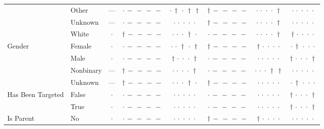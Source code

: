 {\begin{longtable}[t]{llcccccc}
 & Other & --- & ${\cdot}\,{-}\,{-}\,{-}\,{-}$ & ${\cdot}\,{\dagger}\,{\cdot}\,{\dagger}\,{\dagger}$ & ${\dagger}\,{-}\,{-}\,{-}\,{-}$ & ${\cdot}\,{\cdot}\,{\cdot}\,{\cdot}\,{\dagger}$ & ${\cdot}\,{\cdot}\,{\cdot}\,{\cdot}\,{\cdot}$ \\
 & Unknown & --- & ${\cdot}\,{-}\,{-}\,{-}\,{-}$ & ${\cdot}\,{\cdot}\,{\cdot}\,{\cdot}\,{\cdot}$ & ${\dagger}\,{-}\,{-}\,{-}\,{-}$ & ${\cdot}\,{\cdot}\,{\cdot}\,{\cdot}\,{\dagger}$ & ${\cdot}\,{\cdot}\,{\cdot}\,{\cdot}\,{\cdot}$ \\
 & White & $\cdot$ & ${\dagger}\,{-}\,{-}\,{-}\,{-}$ & ${\cdot}\,{\cdot}\,{\cdot}\,{\dagger}\,{\cdot}$ & ${\cdot}\,{-}\,{-}\,{-}\,{-}$ & ${\cdot}\,{\cdot}\,{\cdot}\,{\cdot}\,{\dagger}$ & ${\dagger}\,{\cdot}\,{\cdot}\,{\cdot}\,{\cdot}$ \\
\cline{1-8}
\multirow[t]{4}{*}{Gender} & Female & $\cdot$ & ${\cdot}\,{-}\,{-}\,{-}\,{-}$ & ${\cdot}\,{\cdot}\,{\dagger}\,{\cdot}\,{\dagger}$ & ${\dagger}\,{-}\,{-}\,{-}\,{-}$ & ${\dagger}\,{\cdot}\,{\cdot}\,{\cdot}\,{\cdot}$ & ${\cdot}\,{\dagger}\,{\cdot}\,{\cdot}\,{\cdot}$ \\
 & Male & $\cdot$ & ${\cdot}\,{-}\,{-}\,{-}\,{-}$ & ${\dagger}\,{\cdot}\,{\cdot}\,{\cdot}\,{\dagger}$ & ${\cdot}\,{-}\,{-}\,{-}\,{-}$ & ${\cdot}\,{\cdot}\,{\cdot}\,{\cdot}\,{\cdot}$ & ${\dagger}\,{\cdot}\,{\cdot}\,{\cdot}\,{\dagger}$ \\
 & Nonbinary & --- & ${\dagger}\,{-}\,{-}\,{-}\,{-}$ & ${\cdot}\,{\cdot}\,{\cdot}\,{\cdot}\,{\dagger}$ & ${\cdot}\,{-}\,{-}\,{-}\,{-}$ & ${\cdot}\,{\cdot}\,{\cdot}\,{\dagger}\,{\dagger}$ & ${\cdot}\,{\cdot}\,{\cdot}\,{\cdot}\,{\cdot}$ \\
 & Unknown & --- & ${\dagger}\,{-}\,{-}\,{-}\,{-}$ & ${\cdot}\,{\cdot}\,{\cdot}\,{\dagger}\,{\cdot}$ & ${\dagger}\,{-}\,{-}\,{-}\,{-}$ & ${\cdot}\,{\cdot}\,{\cdot}\,{\cdot}\,{\cdot}$ & ${\cdot}\,{\dagger}\,{\cdot}\,{\cdot}\,{\cdot}$ \\
\cline{1-8}
\multirow[t]{2}{*}{Has Been Targeted} & False & $\cdot$ & ${\cdot}\,{-}\,{-}\,{-}\,{-}$ & ${\cdot}\,{\cdot}\,{\cdot}\,{\cdot}\,{\cdot}$ & ${\cdot}\,{-}\,{-}\,{-}\,{-}$ & ${\cdot}\,{\cdot}\,{\cdot}\,{\cdot}\,{\cdot}$ & ${\dagger}\,{\cdot}\,{\cdot}\,{\cdot}\,{\dagger}$ \\
 & True & $\cdot$ & ${\cdot}\,{-}\,{-}\,{-}\,{-}$ & ${\cdot}\,{\cdot}\,{\cdot}\,{\cdot}\,{\cdot}$ & ${\cdot}\,{-}\,{-}\,{-}\,{-}$ & ${\cdot}\,{\cdot}\,{\cdot}\,{\cdot}\,{\cdot}$ & ${\dagger}\,{\cdot}\,{\cdot}\,{\cdot}\,{\dagger}$ \\
\cline{1-8}
\multirow[t]{3}{*}{Is Parent} & No & $\cdot$ & ${\cdot}\,{-}\,{-}\,{-}\,{-}$ & ${\cdot}\,{\cdot}\,{\cdot}\,{\cdot}\,{\cdot}$ & ${\dagger}\,{-}\,{-}\,{-}\,{-}$ & ${\dagger}\,{\cdot}\,{\cdot}\,{\cdot}\,{\cdot}$ & ${\cdot}\,{\cdot}\,{\cdot}\,{\cdot}\,{\cdot}$ \\

\end{longtable}}
